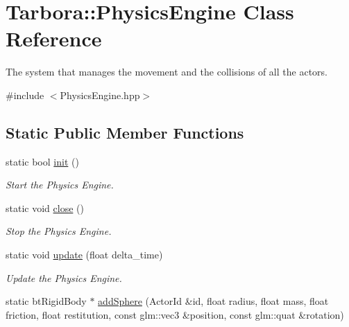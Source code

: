 \hypertarget{classTarbora_1_1PhysicsEngine}{}\section{Tarbora\+:\+:Physics\+Engine Class Reference}
\label{classTarbora_1_1PhysicsEngine}


The system that manages the movement and the collisions of all the actors.  




{\ttfamily \#include $<$Physics\+Engine.\+hpp$>$}

\subsection*{Static Public Member Functions}
\begin{DoxyCompactItemize}
\item 
static bool \hyperlink{classTarbora_1_1PhysicsEngine_a964f0a4c51a88137fe063d5297829b00}{init} ()
\begin{DoxyCompactList}\small\item\em Start the Physics Engine. \end{DoxyCompactList}\item 
\mbox{\label{classTarbora_1_1PhysicsEngine_af8cf9d828f681eb00f0a7f8304c51800}} 
static void \hyperlink{classTarbora_1_1PhysicsEngine_af8cf9d828f681eb00f0a7f8304c51800}{close} ()
\begin{DoxyCompactList}\small\item\em Stop the Physics Engine. \end{DoxyCompactList}\item 
\mbox{\label{classTarbora_1_1PhysicsEngine_afac87332294916fff850683856640a6d}} 
static void \hyperlink{classTarbora_1_1PhysicsEngine_afac87332294916fff850683856640a6d}{update} (float delta\+\_\+time)
\begin{DoxyCompactList}\small\item\em Update the Physics Engine. \end{DoxyCompactList}\item 
static bt\+Rigid\+Body $\ast$ \hyperlink{classTarbora_1_1PhysicsEngine_a2e17e513d5f43612b30c5c6b6a5d6ef1}{add\+Sphere} (Actor\+Id \&id, float radius, float mass, float friction, float restitution, const glm\+::vec3 \&position, const glm\+::quat \&rotation)

\end{DoxyCompactItemize}
